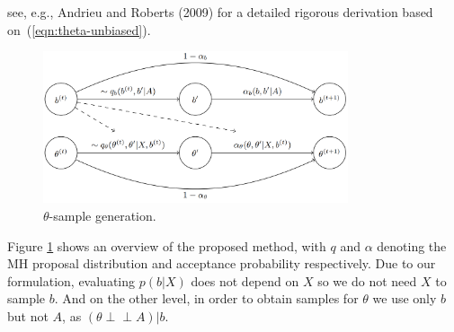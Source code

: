 see, e.g., Andrieu and Roberts (2009) 
for a detailed rigorous derivation based on~(\ref{eqn:theta-unbiased}).
%
\begin{figure}[!ht]
	\centering

%		
%		
%		
%		
	\includegraphics[width=0.8\textwidth]{img/sampling-sequence}
	\caption{$\theta$-sample generation.}
	\label{fig:samp-sequence}
\end{figure}
 
Figure \ref{fig:samp-sequence} shows an overview of the proposed method, with $q$ and $\alpha$ denoting the MH proposal distribution and acceptance probability respectively.
Due to our formulation, evaluating $p(b| X)$ does not depend on $X$ so
we do not need $X$ to sample $b$.
And on the other level, in order to obtain 
samples for $\theta$
we use only $b$ but not $A$, as $(\theta \perp \!\!\! \perp A )| b$. 
